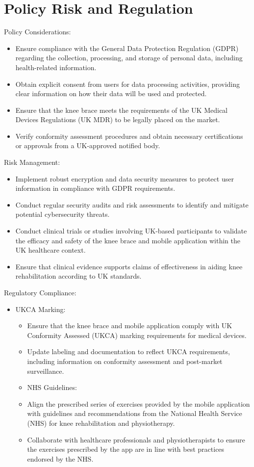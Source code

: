 \documentclass[main.tex]{subfiles}
\begin{document}
\section{Policy Risk and Regulation}

Policy Considerations:
\begin{itemize}
	\item Ensure compliance with the General Data Protection Regulation (GDPR) regarding the collection, processing, and storage of personal data, including health-related information.
	\item Obtain explicit consent from users for data processing activities, providing clear information on how their data will be used and protected.
	\item Ensure that the knee brace meets the requirements of the UK Medical Devices Regulations (UK MDR) to be legally placed on the market.
	\item Verify conformity assessment procedures and obtain necessary certifications or approvals from a UK-approved notified body.
\end{itemize}

Risk Management:
\begin{itemize}
	\item Implement robust encryption and data security measures to protect user information in compliance with GDPR requirements.
	\item Conduct regular security audits and risk assessments to identify and mitigate potential cybersecurity threats.
	\item Conduct clinical trials or studies involving UK-based participants to validate the efficacy and safety of the knee brace and mobile application within the UK healthcare context.
	\item Ensure that clinical evidence supports claims of effectiveness in aiding knee rehabilitation according to UK standards.
\end{itemize}

Regulatory Compliance:
\begin{itemize}
	\item UKCA Marking:
	      \begin{itemize}
		      \item Ensure that the knee brace and mobile application comply with UK Conformity Assessed (UKCA) marking requirements for medical devices.
		      \item Update labeling and documentation to reflect UKCA requirements, including information on conformity assessment and post-market surveillance.
		      \item NHS Guidelines:
		      \item Align the prescribed series of exercises provided by the mobile application with guidelines and recommendations from the National Health Service (NHS) for knee rehabilitation and physiotherapy.
		      \item Collaborate with healthcare professionals and physiotherapists to ensure the exercises prescribed by the app are in line with best practices endorsed by the NHS.
	      \end{itemize}
\end{itemize}
\end{document}
